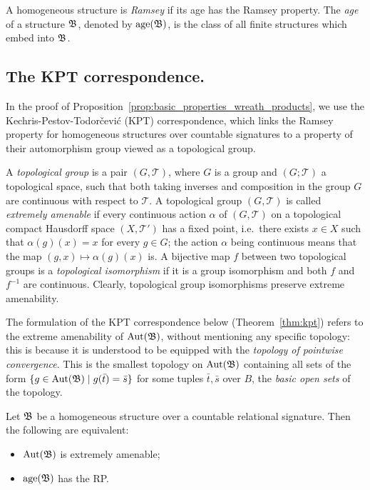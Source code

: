 A homogeneous structure is \emph{Ramsey} if its age has the Ramsey property.
%
 The \emph{age} of a structure $\mathfrak{B}$, denoted by $\mathrm{age}(\mathfrak{B})$, is the class of all finite structures which embed into $\mathfrak{B}$.
  


\subsection*{The KPT correspondence.}
%
In the proof of Proposition~\ref{prop:basic_properties_wreath_products}, we use the Kechris-Pestov-Todor\v{c}evi\'c (KPT) correspondence, which links the Ramsey property for homogeneous structures over countable signatures to a  property of their automorphism group viewed as a topological group. 

A \emph{topological group} is a pair $(G,\mathcal{T})$, where $G$ is a group and $(G;\mathcal{T})$ a topological space, such that both taking inverses and composition in the group $G$ are continuous with respect to $\mathcal{T}$. 
%
A topological group $(G,\mathcal{T})$ is called \emph{extremely amenable} if every continuous action $\alpha$ of $(G,\mathcal{T})$ on a topological compact Hausdorff space $(X,\mathcal{T}')$ has a fixed point, i.e.~there exists $x\in X$ such that $\alpha(g)(x)=x$ for every $g\in G$; the action $\alpha$ being continuous means that  the map $(g,x)\mapsto \alpha(g)(x)$ is.
% 
A bijective map $f$ between two topological groups is a \emph{topological isomorphism} if it is a group isomorphism and  both $f$ and $f^{-1}$ are continuous.
%
Clearly,  topological group isomorphisms preserve extreme amenability. 
%

The formulation of the KPT correspondence below (Theorem~\ref{thm:kpt}) refers to the extreme amenability of $\mathrm{Aut}(\mathfrak{B})$, without mentioning any specific topology: this is because it is understood to be equipped with the \emph{topology of pointwise convergence}.
%
This is the smallest topology on $\mathrm{Aut}(\mathfrak{B})$ containing all sets of the form $\{g\in \mathrm{Aut}(\mathfrak{B}) \mid g(\bar{t}) =\bar{s}\}$ for some tuples $\bar{t},\bar{s}$ over $B$, the \emph{basic open sets} of the topology.
%  
\begin{theorem} \label{thm:kpt} Let $\mathfrak{B}$ be a homogeneous structure over a countable  relational signature. 
%
Then the following are equivalent:
%
\begin{itemize}
    \item $\mathrm{Aut}(\mathfrak{B})$ is extremely amenable;
    \item $\mathrm{age}(\mathfrak{B})$ has the RP.  
\end{itemize} 
\end{theorem}  

